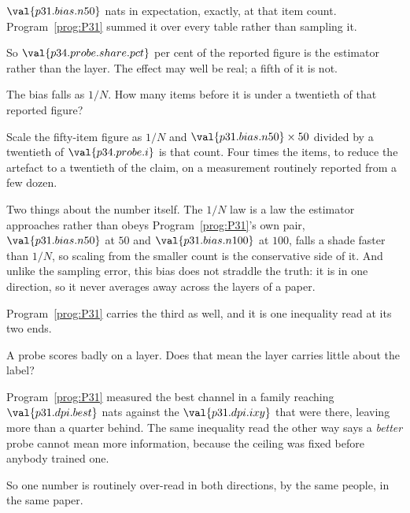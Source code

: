 \begin{fr}
\begin{ansblock}
$\val{p31.bias.n50}$ nats \dash{} in expectation, exactly, at that item
count. Program~\ref{prog:P31} summed it over every table rather than
sampling it.
\end{ansblock}

So $\val{p34.probe.share.pct}$ per cent of the reported figure is the
estimator rather than the layer. The effect may well be real; a fifth of it
is not.

The bias falls as $1/N$. How many items before it is under a twentieth of
that reported figure?
\dotline
\nextframe
\end{fr}

\begin{fr}

Scale the fifty-item figure as $1/N$ and $\val{p31.bias.n50} \times 50$
divided by a twentieth of $\val{p34.probe.i}$ is that count. Four times the
items, to reduce the artefact to a twentieth of the claim, on a measurement
routinely reported from a few dozen.

Two things about the number itself. The $1/N$ law is a law the estimator
approaches rather than obeys \dash{} Program~\ref{prog:P31}'s own pair,
$\val{p31.bias.n50}$ at $50$ and $\val{p31.bias.n100}$ at $100$, falls a
shade faster than $1/N$, so scaling from the smaller count is the
conservative side of it. And unlike the sampling error, this bias does not
straddle the truth: it is in one direction, so it never averages away across
the layers of a paper.
\end{fr}

\begin{fr}
Program~\ref{prog:P31} carries the third as well, and it is one inequality
read at its two ends.

A probe scores badly on a layer. Does that mean the layer carries little
about the label?
\dotline
\nextframe
\end{fr}

\begin{fr}

Program~\ref{prog:P31} measured the best channel in a family reaching
$\val{p31.dpi.best}$ nats against the $\val{p31.dpi.ixy}$ that were there,
leaving more than a quarter behind. The same inequality read the other way
says a \emph{better} probe cannot mean more information, because the ceiling
was fixed before anybody trained one.

So one number is routinely over-read in both directions, by the same people,
in the same paper.
\end{fr}

